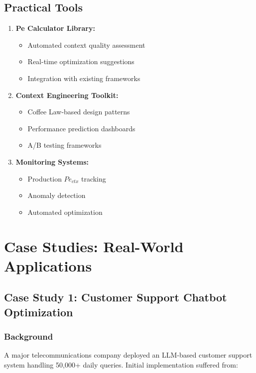 \documentclass[conference]{IEEEtran}
\begin{document}
\subsection{Practical Tools}

\begin{enumerate}
\item \textbf{Pe Calculator Library:}
   \begin{itemize}
   \item Automated context quality assessment
   \item Real-time optimization suggestions
   \item Integration with existing frameworks
   \end{itemize}

\item \textbf{Context Engineering Toolkit:}
   \begin{itemize}
   \item Coffee Law-based design patterns
   \item Performance prediction dashboards
   \item A/B testing frameworks
   \end{itemize}

\item \textbf{Monitoring Systems:}
   \begin{itemize}
   \item Production $Pe_{ctx}$ tracking
   \item Anomaly detection
   \item Automated optimization
   \end{itemize}
\end{enumerate}

\section{Case Studies: Real-World Applications}

\subsection{Case Study 1: Customer Support Chatbot Optimization}

\subsubsection{Background}

A major telecommunications company deployed an LLM-based customer support system handling 50,000+ daily queries. Initial implementation suffered from:
\end{document}

